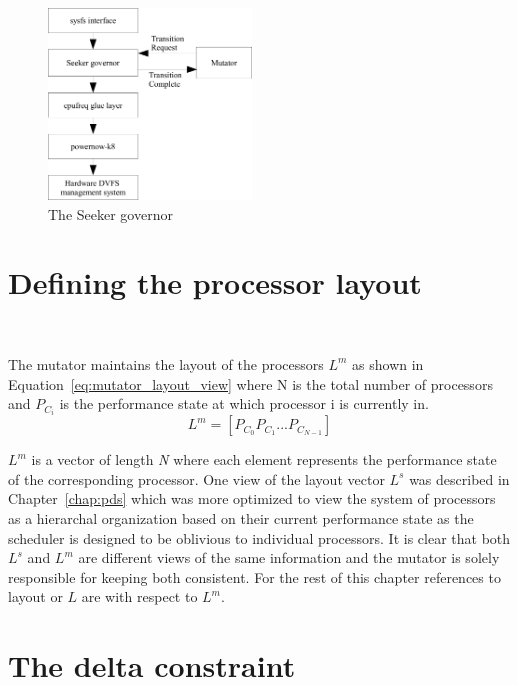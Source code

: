 \begin{figure}[h!]
  \begin{center}
    \includegraphics[height=2in]{figures/seeker_governor.jpg}%
    \caption{The Seeker governor}
    \label{fig:governor}
  \end{center}
\end{figure}

\section{Defining the processor layout}~\label{sec:layout}

The mutator maintains the layout of the processors $L^m$ as shown in Equation~\eqref{eq:mutator_layout_view}
where N is the total number of processors and 
$P_{C_{i}}$ is the performance state at which processor i is currently in. 
\begin{equation}
    L^m = [ P_{C_{0}} P_{C_{1}} ... P_{C_{N-1}} ]
\label{eq:mutator_layout_view}
\end{equation}

$L^m$ is a vector of length \textit{N} where each element represents the performance state
of the corresponding processor. 
One view of the layout vector $L^s$ was described in Chapter~\ref{chap:pds} 
which was more optimized to view the system of processors as a hierarchal organization
based on their current performance state as the scheduler is designed to be oblivious to individual processors. 
It is clear that both $L^s$ and $L^m$ are different views of the same information and 
the mutator is solely responsible for keeping both consistent. For the rest of this chapter
references to layout or $L$ are with respect to $L^m$. 


\section{The delta constraint}~\label{sec:delta_constraint}


